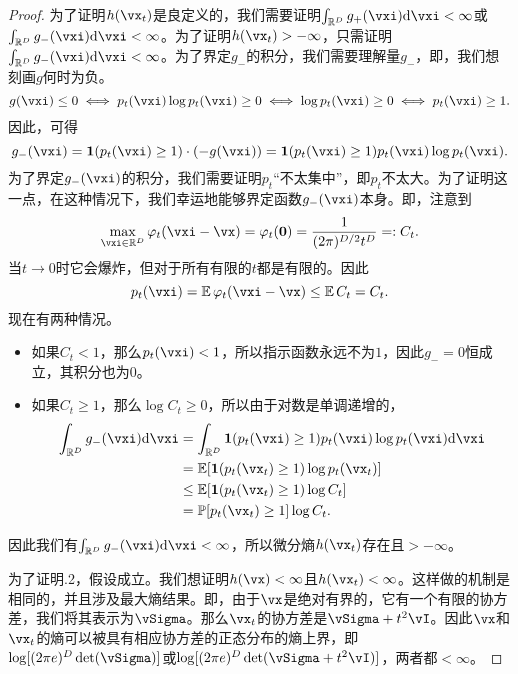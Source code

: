 \documentclass[../../book-main_zh.tex]{subfiles}
\begin{document}
\begin{proof}
    为了证明\(h(\vx_{t})\)是良定义的，我们需要证明\(\int_{\R^{D}}g_{+}(\vxi)\odif{\vxi} < \infty\)或\(\int_{\R^{D}}g_{-}(\vxi) \odif{\vxi} < \infty\)。为了证明\(h(\vx_{t}) > -\infty\)，只需证明\(\int_{\R^{D}}g_{-}(\vxi)\odif{\vxi} < \infty\)。为了界定\(g_{-}\)的积分，我们需要理解量\(g_{-}\)，即，我们想刻画\(g\)何时为负。
    \begin{equation}
        g(\vxi) \leq 0 \iff p_{t}(\vxi)\log p_{t}(\vxi) \geq 0 \iff \log p_{t}(\vxi) \geq 0 \iff p_{t}(\vxi) \geq 1.
    \end{equation}
    因此，可得
    \begin{equation}
        g_{-}(\vxi) = \indvar(p_{t}(\vxi) \geq 1)\cdot (-g(\vxi)) = \indvar(p_{t}(\vxi) \geq 1)p_{t}(\vxi)\log p_{t}(\vxi).
    \end{equation}
    为了界定\(g_{-}(\vxi)\)的积分，我们需要证明\(p_{t}\)“不太集中”，即\(p_{t}\)不太大。为了证明这一点，在这种情况下，我们幸运地能够界定函数\(g_{-}(\vxi)\)本身。即，注意到
    \begin{equation}
        \max_{\vxi \in \R^{D}}\phi_{t}(\vxi - \vx) = \phi_{t}(\vzero) = \frac{1}{(2\pi)^{D/2}t^{D}} =: C_{t}.
    \end{equation}
    当\(t \to 0\)时它会爆炸，但对于所有有限的\(t\)都是有限的。因此
    \begin{equation}
        p_{t}(\vxi) = \Ex \phi_{t}(\vxi - \vx) \leq \Ex C_{t} = C_{t}.
    \end{equation}
    现在有两种情况。
    \begin{itemize}
        \item 如果\(C_{t} < 1\)，那么\(p_{t}(\vxi) < 1\)，所以指示函数永远不为\(1\)，因此\(g_{-} = 0\)恒成立，其积分也为\(0\)。
        \item 如果\(C_{t} \geq 1\)，那么\(\log C_{t} \geq 0\)，所以由于对数是单调递增的，
        \begin{align}
            \int_{\R^{D}}g_{-}(\vxi)\odif{\vxi}
            &= \int_{\R^{D}}\indvar(p_{t}(\vxi) \geq 1)p_{t}(\vxi)\log p_{t}(\vxi)\odif{\vxi}  \\ 
            &= \Ex[\indvar(p_{t}(\vx_{t}) \geq 1)\log p_{t}(\vx_{t})]  \\ 
            &\leq \Ex[\indvar(p_{t}(\vx_{t}) \geq 1) \log C_{t}] \\ 
            &= \Pr[p_{t}(\vx_{t}) \geq 1]\log C_{t}.
        \end{align}
    \end{itemize}
    因此我们有\(\int_{\R^{D}}g_{-}(\vxi)\odif{\vxi} < \infty\)，所以微分熵\(h(\vx_{t})\)存在且\(> -\infty\)。

    为了证明.2，假设成立。我们想证明\(h(\vx) < \infty\)且\(h(\vx_{t}) < \infty\)。这样做的机制是相同的，并且涉及最大熵结果。即，由于\(\vx\)是绝对有界的，它有一个有限的协方差，我们将其表示为\(\vSigma\)。那么\(\vx_{t}\)的协方差是\(\vSigma + t^{2}\vI\)。因此\(\vx\)和\(\vx_{t}\)的熵可以被具有相应协方差的正态分布的熵上界，即\(\log[(2\pi e)^{D}\det(\vSigma)]\)或\(\log[(2\pi e)^{D}\det(\vSigma + t^{2}\vI)]\)，两者都\(< \infty\)。
\end{proof}
\end{document}
